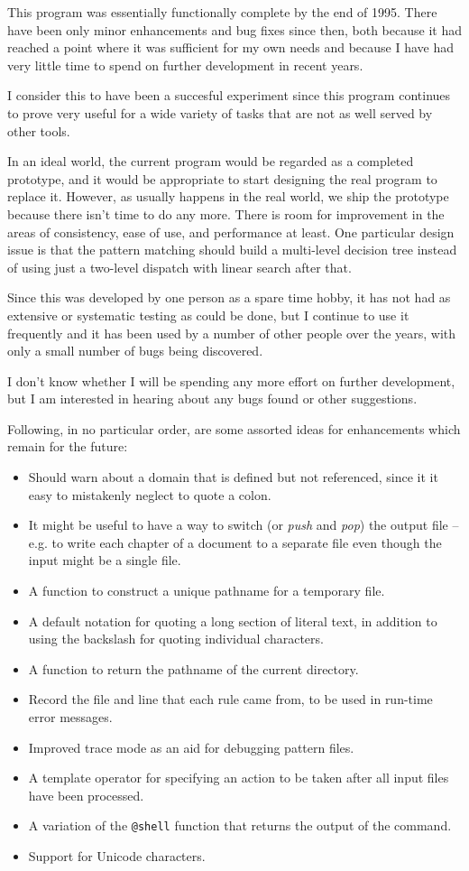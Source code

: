This program was essentially functionally complete by the end of 1995.
There have been only minor enhancements and bug fixes since then, both
because it had reached a point where it was sufficient for my own needs and
because I have had very little time to spend on further development in
recent years.

I consider this to have been a succesful experiment since this program
continues to prove very useful for a wide variety of tasks that are not as
well served by other tools.

In an ideal world, the current program would be
regarded as a completed prototype, and it would be appropriate to start
designing the real program to replace it.  However, as usually happens
in the real world, we ship the prototype because there isn't time to do
any more.  There is room for improvement in the areas of consistency,
ease of use, and performance at least.
One particular design issue is that the pattern matching should build a
multi-level decision tree instead of using just a two-level dispatch with
linear search after that.

Since this was developed by one person as a spare time hobby, it has not
had as extensive or systematic testing as could be done, but I continue to
use it frequently and it has been used by a number of other people over the
years, with only a small number of bugs being discovered.

I don't know  whether I will be spending any more effort on
further development, but I am interested in hearing about any bugs found
or other suggestions.

Following, in no particular order, are some assorted ideas for
enhancements which remain for the future:
\begin{itemize}
\item Should warn about a domain that is defined but not referenced,
since it it easy to mistakenly neglect to quote a colon.
\item It might be useful to have a way to switch 
(or {\em push} and {\em pop}) the output
file -- e.g. to write each chapter of a document to a separate file
even though the input might be a single file.
\item A function to construct a unique pathname for a temporary file.
\item A default notation for quoting a long section of
literal text, in addition to using the backslash for quoting individual
characters.
\item A function to return the pathname of the current directory.
\item Record the file and line that each rule came from, to be used in
run-time error messages.
\item Improved trace mode as an aid for debugging pattern files.
\item A template operator for specifying an action to be taken after all
input files have been processed.
\item A variation of the \verb/@shell/ function that
returns the output of the command.
\item Support for Unicode characters.
\end{itemize}

